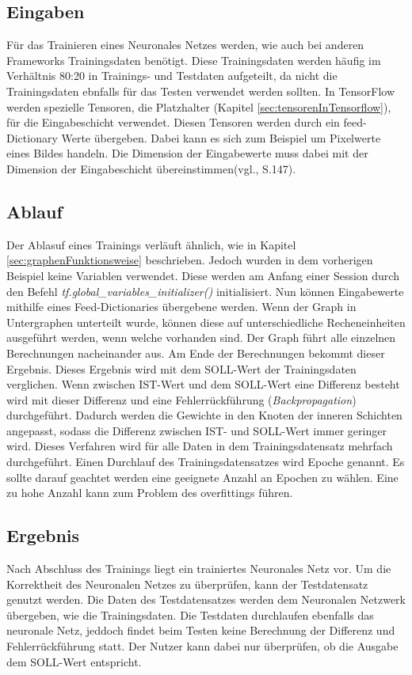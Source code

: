 \subsection{Eingaben}
\label{sec:eingaben}
Für das Trainieren eines Neuronales Netzes werden, wie auch bei anderen Frameworks Trainingsdaten benötigt. Diese Trainingsdaten werden häufig im Verhältnis 80:20 in Trainings- und Testdaten aufgeteilt, da nicht die Trainingsdaten ebnfalls für das Testen verwendet werden sollten. In TensorFlow werden spezielle Tensoren, die Platzhalter (Kapitel \ref{sec:tensorenInTensorflow}), für die Eingabeschicht verwendet. Diesen Tensoren werden durch ein feed-Dictionary Werte übergeben. Dabei kann es sich zum Beispiel um Pixelwerte eines Bildes handeln. Die Dimension der Eingabewerte muss dabei mit der Dimension der Eingabeschicht übereinstimmen(vgl.\citep{DeepLearning}, S.147). 

\subsection{Ablauf}
\label{sec:ablauf}
Der Ablasuf eines Trainings verläuft ähnlich, wie in Kapitel \ref{sec:graphenFunktionsweise} beschrieben. Jedoch wurden in dem vorherigen Beispiel keine Variablen verwendet. Diese werden am Anfang einer Session durch den Befehl \textit{tf.global\_variables\_initializer()} initialisiert. Nun können Eingabewerte mithilfe eines Feed-Dictionaries übergebene werden. Wenn der Graph in Untergraphen unterteilt wurde, können diese auf unterschiedliche Recheneinheiten ausgeführt werden, wenn welche vorhanden sind. Der Graph führt alle einzelnen Berechnungen nacheinander aus. Am Ende der Berechnungen bekommt dieser Ergebnis. Dieses Ergebnis wird mit dem SOLL-Wert der Trainingsdaten verglichen. Wenn zwischen IST-Wert und dem SOLL-Wert eine Differenz besteht wird mit dieser Differenz und eine Fehlerrückführung (\textit{Backpropagation}) durchgeführt. Dadurch werden die Gewichte in den Knoten der inneren Schichten angepasst, sodass die Differenz zwischen IST- und SOLL-Wert immer geringer wird. Dieses Verfahren wird für alle Daten in dem Trainingsdatensatz mehrfach durchgeführt. Einen Durchlauf des Trainingsdatensatzes wird Epoche genannt. Es sollte darauf geachtet werden eine geeignete Anzahl an Epochen zu wählen. Eine zu hohe Anzahl kann zum Problem des overfittings führen.

\subsection{Ergebnis}
\label{sec:ergebnis}
Nach Abschluss des Trainings liegt ein trainiertes Neuronales Netz vor. Um die Korrektheit des Neuronalen Netzes zu überprüfen, kann der Testdatensatz genutzt werden. Die Daten des Testdatensatzes werden dem Neuronalen Netzwerk übergeben, wie die Trainingsdaten. Die Testdaten durchlaufen ebenfalls das neuronale Netz, jeddoch findet beim Testen keine Berechnung der Differenz und Fehlerrückführung statt. Der Nutzer kann dabei nur überprüfen, ob die Ausgabe dem SOLL-Wert entspricht. 

